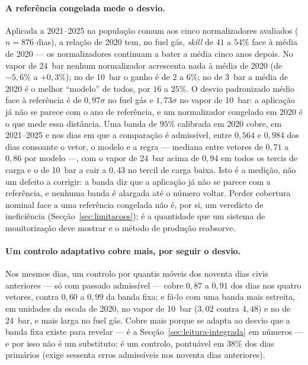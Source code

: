 \paragraph{A referência congelada mede o desvio.} Aplicada a 2021--2025 na
população comum aos cinco normalizadores avaliados ($n = 876$ dias), a
relação de 2020 tem, no fuel gás, \emph{skill} de $41$ a $54\%$ face à média
de 2020 --- os normalizadores continuam a bater a média cinco anos depois.
No vapor de 24~bar nenhum normalizador acrescenta nada à média de 2020 (de
$-5{,}6\%$ a $+0{,}3\%$); no de 10~bar o ganho é de $2$ a $6\%$; no de
3~bar a média de 2020 é o melhor ``modelo'' de todos, por $16$ a $25\%$. O
desvio padronizado médio face à referência é de $0{,}97\sigma$ no fuel gás
e $1{,}73\sigma$ no vapor de 10~bar: a aplicação já não se parece com o ano
de referência, e um normalizador congelado em 2020 é o que mede essa
distância. Uma banda de $95\%$ calibrada em 2020 cobre, em 2021--2025 e nos
dias em que a comparação é admissível, entre $0{,}564$ e $0{,}984$ dos dias
consoante o vetor, o modelo e a regra --- mediana entre vetores de
$0{,}71$ a $0{,}86$ por modelo ---, com o vapor de 24~bar acima de $0{,}94$
em todos os tercis de carga e o de 10~bar a cair a $0{,}43$ no tercil de
carga baixa. Isto é a medição, não um defeito a corrigir: a banda diz que a
aplicação já não se parece com a referência, e nenhuma banda é alargada até
o número voltar. Perder cobertura nominal face a uma referência congelada
não é, por si, um veredicto de ineficiência (Secção~\ref{sec:limitacoes});
é a quantidade que um sistema de monitorização deve mostrar e o método de
produção reabsorve.

\paragraph{Um controlo adaptativo cobre mais, por seguir o desvio.} Nos
mesmos dias, um controlo por quantis móveis dos noventa dias civis
anteriores --- só com passado admissível --- cobre $0{,}87$ a $0{,}91$ dos
dias nos quatro vetores, contra $0{,}60$ a $0{,}99$ da banda fixa; e fá-lo
com uma banda mais estreita, em unidades da escala de 2020, no vapor de
10~bar ($3{,}02$ contra $4{,}48$) e no de 24~bar, e mais larga no fuel gás.
Cobre mais porque se adapta ao desvio que a banda fixa existe para revelar
--- é a Secção~\ref{sec:leitura-integrada} em números --- e por isso não é
um substituto: é um controlo, pontuável em $38\%$ dos dias primários
(exige sessenta erros admissíveis nos noventa dias anteriores).

